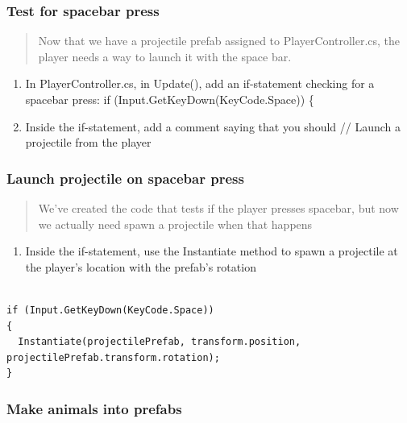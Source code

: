 \documentclass[
]{book}
\providecommand{\tightlist}{%
  \setlength{\itemsep}{0pt}\setlength{\parskip}{0pt}}
\begin{document}
\hypertarget{test-for-spacebar-press}{%
\subsubsection{Test for spacebar press}\label{test-for-spacebar-press}}

\begin{quote}
Now that we have a projectile prefab assigned to PlayerController.cs, the player needs a way to launch it with the space bar.
\end{quote}

\begin{enumerate}
\def\labelenumi{\arabic{enumi}.}
\tightlist
\item
  In PlayerController.cs, in Update(), add an if-statement checking for a spacebar press:
  if (Input.GetKeyDown(KeyCode.Space)) \{
\item
  Inside the if-statement, add a comment saying that you should // Launch a projectile from the player
\end{enumerate}

\hypertarget{launch-projectile-on-spacebar-press}{%
\subsubsection{Launch projectile on spacebar press}\label{launch-projectile-on-spacebar-press}}

\begin{quote}
We've created the code that tests if the player presses spacebar, but now we actually need spawn a projectile when that happens
\end{quote}

\begin{enumerate}
\def\labelenumi{\arabic{enumi}.}
\tightlist
\item
  Inside the if-statement, use the Instantiate method to spawn a projectile at the player's location with the prefab's rotation
\end{enumerate}

\begin{verbatim}

if (Input.GetKeyDown(KeyCode.Space))
{
  Instantiate(projectilePrefab, transform.position, projectilePrefab.transform.rotation); 
}
\end{verbatim}

\hypertarget{make-animals-into-prefabs}{%
\subsubsection{Make animals into prefabs}\label{make-animals-into-prefabs}}
\end{document}
